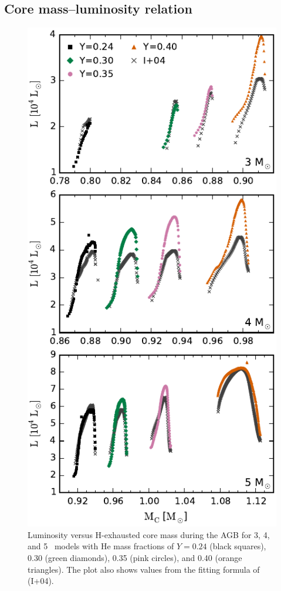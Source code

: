 \subsection{Core mass--luminosity relation}
\begin{figure}
 \begin{center}\includegraphics[height=0.85\textheight]{fig-coremass-luminosity.pdf}\end{center}
 \caption{Luminosity versus H-exhausted core mass during the AGB for 3, 4, and 5 \Msun\ models with He mass fractions of $Y= 0.24$ (black squares), 0.30 (green diamonds), 0.35 (pink circles), and 0.40 (orange triangles). The plot also shows values from the fitting formula of \citet{Izzard:2004bq} (I+04).}\label{fig:cmlr}
\end{figure}

